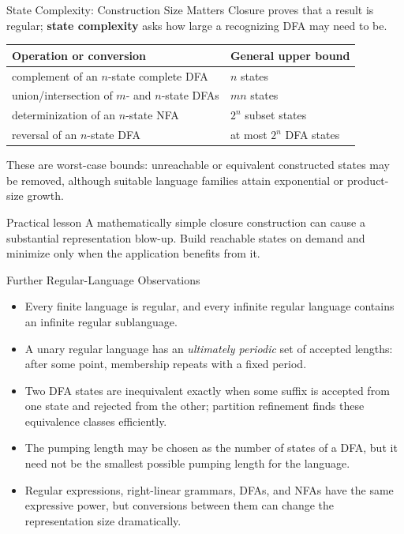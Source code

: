 \documentclass[10pt]{beamer}
\begin{document}
\begin{frame}{State Complexity: Construction Size Matters}
  \small
  Closure proves that a result is regular; \textbf{state complexity} asks how
  large a recognizing DFA may need to be.
  \pause
  \begin{center}
  \begin{tabular}{l l}
    \textbf{Operation or conversion} & \textbf{General upper bound}\\
    \hline
    complement of an $n$-state complete DFA & $n$ states\\
    union/intersection of $m$- and $n$-state DFAs & $mn$ states\\
    determinization of an $n$-state NFA & $2^n$ subset states\\
    reversal of an $n$-state DFA & at most $2^n$ DFA states
  \end{tabular}
  \end{center}
  \pause
  These are worst-case bounds: unreachable or equivalent constructed states
  may be removed, although suitable language families attain exponential or
  product-size growth.
  \begin{alertblock}{Practical lesson}
    A mathematically simple closure construction can cause a substantial
    representation blow-up. Build reachable states on demand and minimize
    only when the application benefits from it.
  \end{alertblock}
\end{frame}

\begin{frame}{Further Regular-Language Observations}
  \small
  \begin{itemize}
    \item Every finite language is regular, and every infinite regular
      language contains an infinite regular sublanguage.
    \pause
    \item A unary regular language has an \emph{ultimately periodic} set of
      accepted lengths: after some point, membership repeats with a fixed
      period.
    \pause
    \item Two DFA states are inequivalent exactly when some suffix is accepted
      from one state and rejected from the other; partition refinement finds
      these equivalence classes efficiently.
    \pause
    \item The pumping length may be chosen as the number of states of a DFA,
      but it need not be the smallest possible pumping length for the
      language.
    \pause
    \item Regular expressions, right-linear grammars, DFAs, and NFAs have the
      same expressive power, but conversions between them can change the
      representation size dramatically.
  \end{itemize}
\end{frame}
\end{document}
